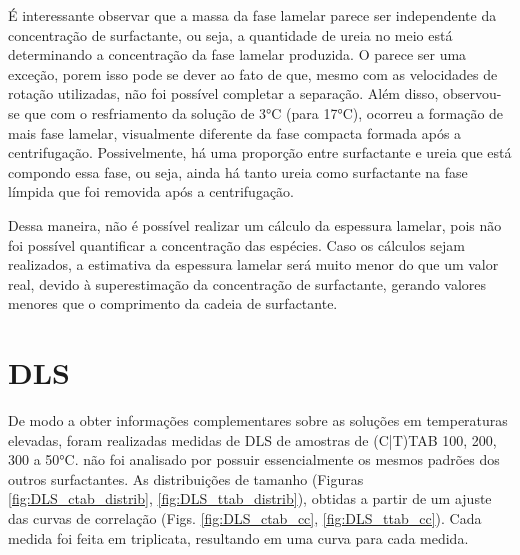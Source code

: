 	É interessante observar que a massa da fase lamelar parece ser independente da concentração de surfactante, ou seja, a quantidade de ureia no meio está determinando a concentração da fase lamelar produzida. O \CTAB{} parece ser uma exceção, porem isso pode se dever ao fato de que, mesmo com as velocidades de rotação utilizadas, não foi possível completar a separação. Além disso, observou-se que com o resfriamento da solução de 3°C (para 17°C), ocorreu a formação de mais fase lamelar, visualmente diferente da fase compacta formada após a centrifugação. Possivelmente, há uma proporção entre surfactante e ureia que está compondo essa fase, ou seja, ainda há tanto ureia como surfactante na fase límpida que foi removida após a centrifugação.
	
	Dessa maneira, não é possível realizar um cálculo da espessura lamelar, pois não foi possível quantificar a concentração das espécies. Caso os cálculos sejam realizados, a estimativa da espessura lamelar será muito menor do que um valor real, devido à superestimação da concentração de surfactante, gerando valores menores que o comprimento da cadeia de surfactante.
	\FloatBarrier
\section{DLS}
\label{sec:Ureia-DLS}

	De modo a obter informações complementares sobre as soluções em temperaturas elevadas, foram realizadas medidas de DLS de amostras de (C|T)TAB 100, 200, 300 \mM{} a 50°C. \DTAB{} não foi analisado por possuir essencialmente os mesmos padrões dos outros surfactantes. As distribuições de tamanho (Figuras \ref{fig:DLS_ctab_distrib}, \ref{fig:DLS_ttab_distrib}), obtidas a partir de um ajuste das curvas de correlação (Figs. \ref{fig:DLS_ctab_cc}, \ref{fig:DLS_ttab_cc}). Cada medida foi feita em triplicata, resultando em uma curva para cada medida.
	
